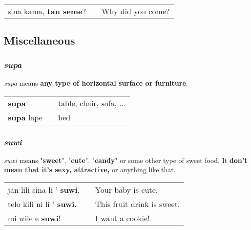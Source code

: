 \begin{supertabular}{p{5,5cm}|ll}
sina kama, \textbf{tan seme}? && Why did you come? \\
\end{supertabular} 

%
\subsection*{Miscellaneous}
%
\subsubsection*{\textit{supa}}
%
\textit{supa} means \textbf{any type of horizontal surface or furniture}. 

\begin{supertabular}{p{5,5cm}|ll}
\textbf{supa}  && table, chair, sofa, ...  \\
\textbf{supa} lape &&  bed \\
\end{supertabular} 
%
\subsubsection*{\textit{suwi}}
%
\textit{suwi} means "\textbf{sweet}", "\textbf{cute}", "\textbf{candy}" or some other type of sweet food. 
It \textbf{don't mean that it's sexy, attractive,} or anything like that. 

\begin{supertabular}{p{5,5cm}|ll}
jan lili sina li ' \textbf{suwi}. && Your baby is cute. \\
telo kili ni li ' \textbf{suwi}. && This fruit drink is sweet. \\
mi wile e \textbf{suwi}! && I want a cookie! \\
\end{supertabular} 
%
